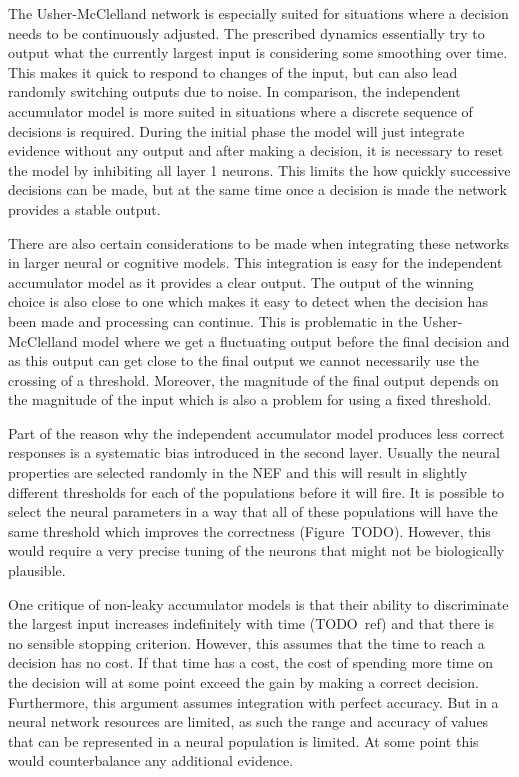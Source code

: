 \documentclass[10pt,letterpaper]{article}
\begin{document}
The Usher-McClelland network is especially suited for situations where 
a decision needs to be continuously adjusted. The prescribed dynamics 
essentially try to output what the currently largest input is considering some 
smoothing over time. This makes it quick to respond to changes of the input, but 
can also lead randomly switching outputs due to noise. In comparison, the 
independent accumulator model is more suited in situations where a discrete 
sequence of decisions is required. During the initial phase the model will just 
integrate evidence without any output and after making a decision, it is 
necessary to reset the model by inhibiting all layer 1 neurons. This limits the 
how quickly successive decisions can be made, but at the same time once 
a decision is made the network provides a stable output.

There are also certain considerations to be made when integrating these networks 
in larger neural or cognitive models. This integration is easy for the 
independent accumulator model as it provides a clear output. The output of the 
winning choice is also close to one which makes it easy to detect when the 
decision has been made and processing can continue. This is problematic in the 
Usher-McClelland model where we get a fluctuating output before the final 
decision and as this output can get close to the final output we cannot 
necessarily use the crossing of a threshold. Moreover, the magnitude of the 
final output depends on the magnitude of the input which is also a problem for 
using a fixed threshold.

Part of the reason why the independent accumulator model produces less correct 
responses is a systematic bias introduced in the second layer. Usually the 
neural properties are selected randomly in the NEF and this will result in 
slightly different thresholds for each of the populations before it will fire.  
It is possible to select the neural parameters in a way that all of these 
populations will have the same threshold which improves the correctness 
(Figure~TODO). However, this would require a very precise tuning of the neurons 
that might not be biologically plausible.

One critique of non-leaky accumulator models is that their ability to 
discriminate the largest input increases indefinitely with time (TODO~ref) and 
that there is no sensible stopping criterion. However, this assumes that the 
time to reach a decision has no cost. If that time has a cost, the cost of 
spending more time on the decision will at some point exceed the gain by making 
a correct decision. Furthermore, this argument assumes integration with perfect 
accuracy. But in a neural network resources are limited, as such the range and 
accuracy of values that can be represented in a neural population is limited.  
At some point this would counterbalance any additional evidence.
\end{document}
